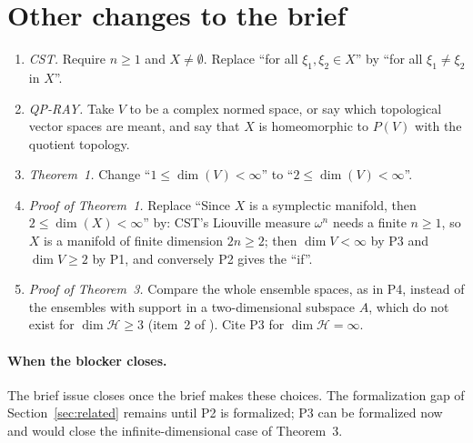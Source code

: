 \documentclass[11pt]{article}
\begin{document}
\section{Other changes to the brief}
\begin{enumerate}
\item \emph{CST.} Require $n \ge 1$ and $X \ne \emptyset$. Replace ``for all
  $\xi_1, \xi_2 \in X$'' by ``for all $\xi_1 \ne \xi_2$ in $X$''.
\item \emph{QP-RAY.} Take $V$ to be a complex normed space, or say which topological vector
  spaces are meant, and say that $X$ is homeomorphic to $P(V)$ with the quotient topology.
\item \emph{Theorem~1.} Change ``$1 \le \dim(V) < \infty$'' to ``$2 \le \dim(V) < \infty$''.
\item \emph{Proof of Theorem~1.} Replace ``Since $X$ is a symplectic manifold, then
  $2 \le \dim(X) < \infty$'' by: CST's Liouville measure $\omega^n$ needs a finite $n \ge 1$,
  so $X$ is a manifold of finite dimension $2n \ge 2$; then $\dim V < \infty$ by P3 and
  $\dim V \ge 2$ by P1, and conversely P2 gives the ``if''.
\item \emph{Proof of Theorem~3.} Compare the whole ensemble spaces, as in P4, instead of the
  ensembles with support in a two-dimensional subspace $A$, which do not exist for
  $\dim\mathcal H \ge 3$ (item~2 of ). Cite P3 for
  $\dim\mathcal H = \infty$.
\end{enumerate}

\paragraph{When the blocker closes.} The brief issue closes once the brief makes these choices.
The formalization gap of Section~\ref{sec:related} remains until P2 is formalized; P3 can be
formalized now and would close the infinite-dimensional case of Theorem~3.
\end{document}
